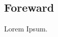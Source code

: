 \documentclass[14pt,a4paper]{article}
\begin{document}
	
	\begin{CenturySchool}
		
		
		\tableofcontents
		
		\section{Foreward}
		Lorem Ipsum.
	\end{CenturySchool}
\end{document}
